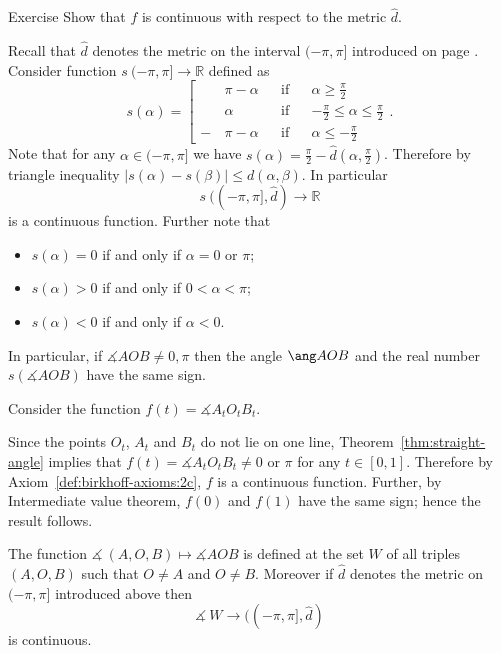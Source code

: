 {\begin{thm}{Exercise}
Show that $f$ is continuous with respect to the metric $\hat d$.
\end{thm}











Recall that $\hat d$ denotes the metric on the interval $(-\pi,\pi]$
introduced on page \pageref{def:max-dist}.
Consider function $s\:(-\pi,\pi]\to \mathbb{R}$
defined as 
$$s(\alpha)=\left[
\begin{aligned}
&\pi-\alpha&&\text{if}&&\alpha\ge\tfrac\pi2
\\
&\alpha&&\text{if}&&-\tfrac\pi2\le\alpha\le\tfrac\pi2
\\
-\,&\pi-\alpha&&\text{if}&&\alpha\le-\tfrac\pi2
\end{aligned}
\right.
.$$
Note that for any $\alpha\in (-\pi,\pi]$ we have
$s(\alpha)=\tfrac\pi2-\hat d(\alpha,\tfrac\pi2)$.
Therefore by triangle inequality
$|s(\alpha)-s(\beta)|\le d(\alpha,\beta)$. 
In particular 
$$s\:((-\pi,\pi],\hat{d})\to\mathbb{R}$$ 
is a continuous function.
Further note that
\begin{itemize}
\item $s(\alpha)=0$ if and only if $\alpha=0$ or $\pi$;
\item $s(\alpha)>0$ if and only if $0<\alpha<\pi$;
\item $s(\alpha)<0$ if and only if $\alpha<0$.
\end{itemize}
In particular, if $\measuredangle AOB\ne 0,\pi$ 
then the angle $\ang AOB$ and the real number $s(\measuredangle AOB)$ have the same sign.

Consider the function 
$f(t)=\measuredangle A_tO_tB_t$.

Since 
the points $O_t$, $A_t$ and $B_t$ do not lie on one line,
Theorem~\ref{thm:straight-angle} implies that $f(t)=\measuredangle A_tO_tB_t\ne 0$ or $\pi$ for any $t\in[0,1]$.
Therefore by Axiom~\ref{def:birkhoff-axioms:2c},
$f$ is a continuous function.
Further,
by Intermediate value theorem, $f(0)$ and $f(1)$ have the same sign;
hence the result follows.
\qeds








\item\label{def:birkhoff-axioms:2c} 
The function $\measuredangle\:(A,O,B)\mapsto\measuredangle A O B$
is defined at the set $W$ of all triples 
$(A,O,B)$ such that $O\ne A$ and $O\ne B$.
Moreover if $\hat{d}$ denotes the metric on $(-\pi,\pi]$ introduced above then
$$\measuredangle\: W\to ((-\pi,\pi],\hat{d})$$ 
is continuous.









}
